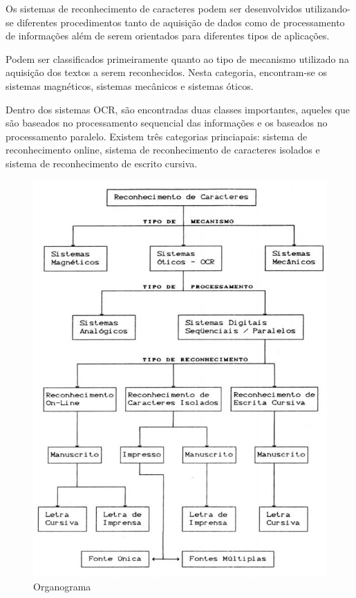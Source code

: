 		Os sistemas de reconhecimento de caracteres podem ser desenvolvidos utilizando-se diferentes procedimentos tanto de aquisição de dados como de processamento de informações além de serem orientados para diferentes tipos de aplicações.
	
		Podem ser classificados primeiramente quanto ao tipo de mecanismo utilizado na aquisição dos textos a serem reconhecidos. Nesta categoria, encontram-se os sistemas magnéticos, sistemas mecânicos e sistemas óticos.
	
		Dentro dos sistemas OCR, são encontradas duas classes importantes, aqueles que são baseados no processamento sequencial das informações e os baseados no processamento paralelo. Existem três categorias princiapais: sistema de reconhecimento online, sistema de reconhecimento de caracteres isolados e sistema de reconhecimento de escrito cursiva.
	
	\begin{figure}[!htb]
		\centering
		\includegraphics[scale=0.4]{img/organograma-tipos.jpg}
		\caption{Organograma}
		\label{Organograma}
	\end{figure}
	
